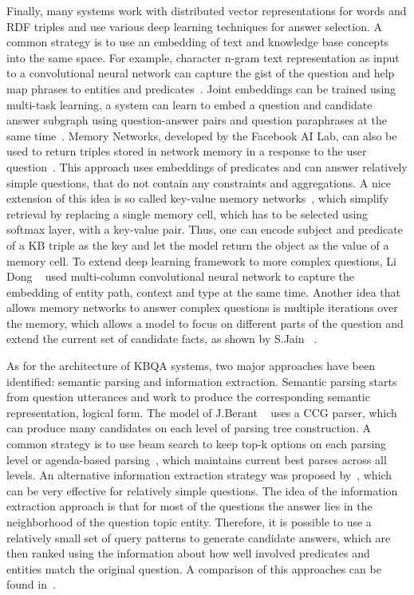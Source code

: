 Finally, many systems work with distributed vector representations for words and RDF triples and use various deep learning techniques for answer selection.
A common strategy is to use an embedding of text and knowledge base concepts into the same space.
For example, character n-gram text representation as input to a convolutional neural network can capture the gist of the question and help map phrases to entities and predicates~\cite{yih2014semantic}.
Joint embeddings can be trained using multi-task learning, \eg a system can learn to embed a question and candidate answer subgraph using question-answer pairs and question paraphrases at the same time~\cite{BordesCW14:emnlp}.
Memory Networks, developed by the Facebook AI Lab, can also be used to return triples stored in network memory in a response to the user question~\cite{bordes2015large}.
This approach uses embeddings of predicates and can answer relatively simple questions, that do not contain any constraints and aggregations.
A nice extension of this idea is so called key-value memory networks~\cite{miller2016key}, which simplify retrieval by replacing a single memory cell, which has to be selected using softmax layer, with a key-value pair.
Thus, one can encode subject and predicate of a KB triple as the key and let the model return the object as the value of a memory cell.
To extend deep learning framework to more complex questions, Li Dong \etal~\cite{dong2015question} used multi-column convolutional neural network to capture the embedding of entity path, context and type at the same time.
Another idea that allows memory networks to answer complex questions is multiple iterations over the memory, which allows a model to focus on different parts of the question and extend the current set of candidate facts, as shown by S.Jain ~\cite{jain2016question}.

As for the architecture of KBQA systems, two major approaches have been identified: semantic parsing and information extraction.
Semantic parsing starts from question utterances and work to produce the corresponding semantic representation, \eg logical form.
The model of J.Berant \etal~\cite{BerantCFL13:sempre} uses a CCG parser, which can produce many candidates on each level of parsing tree construction.
A common strategy is to use beam search to keep top-k options on each parsing level or agenda-based parsing~\cite{berant2015imitation}, which maintains current best parses across all levels.
An alternative information extraction strategy was proposed by~\cite{YaoD14}, which can be very effective for relatively simple questions.
The idea of the information extraction approach is that for most of the questions the answer lies in the neighborhood of the question topic entity.
Therefore, it is possible to use a relatively small set of query patterns to generate candidate answers, which are then ranked using the information about how well involved predicates and entities match the original question.
A comparison of this approaches can be found in~\cite{yao2014freebase}.

